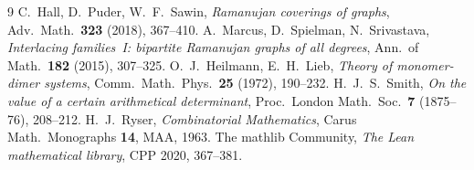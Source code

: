 \documentclass[11pt]{article}
\theoremstyle{remark}\newtheorem{remark}[theorem]{Remark}
\begin{document}
\begin{thebibliography}{9}
 C.~Hall, D.~Puder, W.~F.~Sawin,
  \emph{Ramanujan coverings of graphs}, Adv.\ Math.\ \textbf{323} (2018),
  367--410.
 A.~Marcus, D.~Spielman, N.~Srivastava,
  \emph{Interlacing families~I: bipartite Ramanujan graphs of all degrees},
  Ann.\ of Math.\ \textbf{182} (2015), 307--325.
 O.~J.~Heilmann, E.~H.~Lieb,
  \emph{Theory of monomer-dimer systems}, Comm.\ Math.\ Phys.\ \textbf{25}
  (1972), 190--232.
 H.~J.~S.~Smith,
  \emph{On the value of a certain arithmetical determinant},
  Proc.\ London Math.\ Soc.\ \textbf{7} (1875--76), 208--212.
 H.~J.~Ryser, \emph{Combinatorial Mathematics},
  Carus Math.\ Monographs \textbf{14}, MAA, 1963.
 The mathlib Community,
  \emph{The Lean mathematical library}, CPP 2020, 367--381.
\end{thebibliography}
\end{document}
